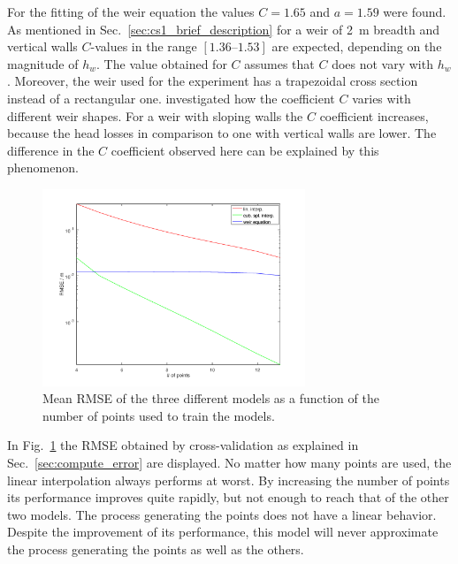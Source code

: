 For the fitting of the weir equation the values $C = 1.65$ and $a = 1.59$ were found.
As mentioned in Sec.~\ref{sec:cs1_brief_description} for a weir of \SI{2}{\m} breadth and vertical walls $C$-values in the range $[\numrange{1.36}{1.53}]$ are expected, depending on the magnitude of $h_w$.
The value obtained for $C$ assumes that $C$ does not vary with $h_w$.
Moreover, the weir used for the experiment has a trapezoidal cross section instead of a rectangular one.
\cite{tracy_discharge_1957} investigated how the coefficient $C$ varies with different weir shapes.
For a weir with sloping walls the $C$ coefficient increases, because the head losses in comparison to one with vertical walls are lower.
The difference in the $C$ coefficient observed here can be explained by this phenomenon.\\

\begin{figure}[h]
  \centering
  \includegraphics[width=0.7\textwidth]{Figures/fitting_errors.png}
  \caption{Mean RMSE of the three different models as a function of the number of points used to train the models.}
  \label{fig:fitting_errors}
\end{figure}

In Fig.~\ref{fig:fitting_errors} the RMSE obtained by cross-validation as explained in Sec.~\ref{sec:compute_error} are displayed.
No matter how many points are used, the linear interpolation always performs at worst.
By increasing the number of points its performance improves quite rapidly, but not enough to reach that of the other two models.
The process generating the points does not have a linear behavior.
Despite the improvement of its performance, this model will never approximate the process generating the points as well as the others.

